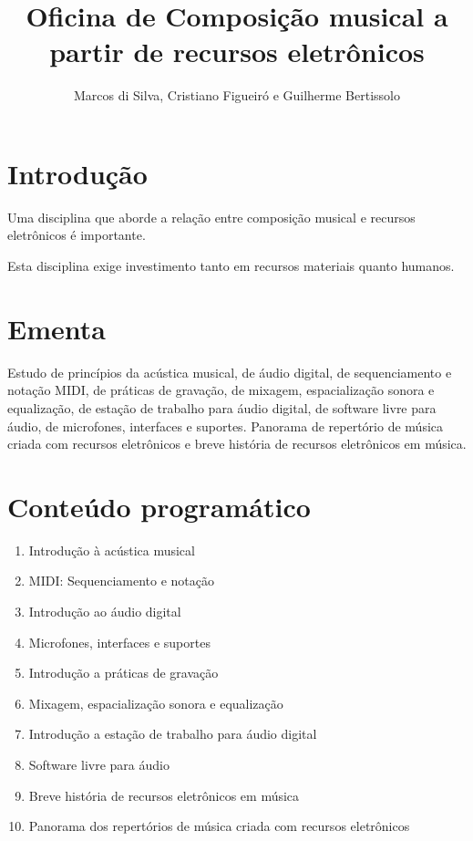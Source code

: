 \documentclass[12pt]{article}
\begin{document}
\title{Oficina de Composição musical a partir de recursos eletrônicos}
\author{Marcos di Silva, Cristiano Figueiró e Guilherme Bertissolo}
\maketitle

\thispagestyle{empty}

\section{Introdução}

Uma disciplina que aborde a relação entre composição musical e
recursos eletrônicos é importante.

Esta disciplina exige investimento tanto em recursos materiais quanto
humanos.

\section{Ementa}

Estudo de princípios da acústica musical, de áudio digital, de
sequenciamento e notação MIDI, de práticas de gravação, de mixagem,
espacialização sonora e equalização, de estação de trabalho para áudio
digital, de software livre para áudio, de microfones, interfaces e
suportes. Panorama de repertório de música criada com recursos
eletrônicos e breve história de recursos eletrônicos em música.

\section{Conteúdo programático}

\begin{enumerate}
\item Introdução à acústica musical
\item MIDI: Sequenciamento e notação
\item Introdução ao áudio digital
\item Microfones, interfaces e suportes
\item Introdução a práticas de gravação
\item Mixagem, espacialização sonora e equalização
\item Introdução a estação de trabalho para áudio digital
\item Software livre para áudio
\item Breve história de recursos eletrônicos em música
\item Panorama dos repertórios de música criada com recursos eletrônicos
\end{enumerate}
\end{document}
